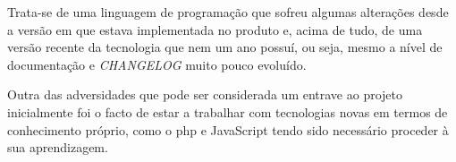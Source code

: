 Trata-se de uma linguagem de programação que sofreu algumas alterações desde a versão em que estava implementada no produto e, acima de tudo, de uma versão recente da tecnologia que nem um ano possuí, ou seja, mesmo a nível de documentação e \textit{CHANGELOG} muito pouco evoluído.

Outra das adversidades que pode ser considerada um entrave ao projeto inicialmente foi o facto de estar a trabalhar com tecnologias novas em termos de conhecimento próprio, como o \acrshort{php} e JavaScript tendo sido necessário proceder à sua aprendizagem.

